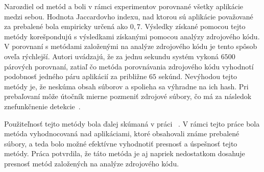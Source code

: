 Narozdiel od metód  a  boli v rámci experimentov porovnané všetky aplikácie medzi sebou. Hodnota Jaccardovho indexu, nad ktorou sú aplikácie považované za prebalené bola empiricky určená ako $0,7$.
Výsledky získané pomocou tejto metódy korešpondujú s výsledkami získanými pomocou analýzy zdrojového kódu. V porovnaní s metódami založenými na analýze zdrojového kódu je tento spôsob oveľa rýchlejší. Autori uvádzajú, že za jednu sekundu systém vykoná $6500$ párových porovnaní, zatiaľ čo metóda porovnávania zdrojového kódu vyhodnotí podobnosť jedného páru aplikácií za približne $65$ sekúnd. 
Nevýhodou tejto metódy je, že neskúma obsah súborov a spolieha sa výhradne na ich hash. Pri prebaľovaní môže útočník mierne pozmeniť zdrojové súbory, čo má za následok znefunkčnenie detekcie~\cite{Zhauniarovich2014}. 

Použiteľnosť tejto metódy bola ďalej skúmaná v práci ~\cite{Gadyatskaya2016}. V rámci tejto práce bola metóda vyhodnocovaná nad aplikáciami, ktoré obsahovali známe prebalené súbory, a teda bolo možné efektívne vyhodnotiť presnosť a úspešnosť tejto metódy. Práca potvrdila, že táto metóda je aj napriek nedostatkom dosahuje presnosť metód založených na analýze zdrojového kódu.
